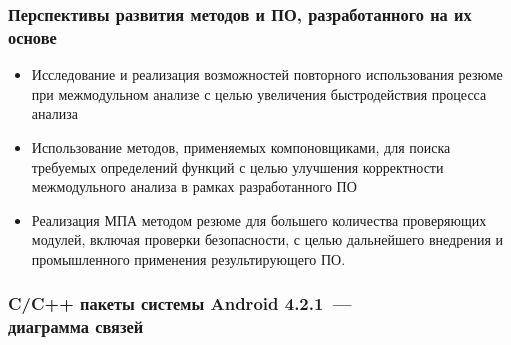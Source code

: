 \documentclass[10pt,gray]{beamer}
\begin{document}
\begin{frame}
\frametitle{Перспективы развития методов и ПО, разработанного на их основе}
\begin{itemize}
  \item Исследование и реализация возможностей повторного использования резюме при межмодульном анализе с целью увеличения быстродействия процесса анализа
  \item Использование методов, применяемых компоновщиками, для поиска требуемых определений функций с целью улучшения корректности межмодульного анализа в рамках разработанного ПО
  \item Реализация МПА методом резюме для большего количества проверяющих модулей, включая проверки безопасности, с целью дальнейшего внедрения и промышленного применения результирующего ПО. 
\end{itemize}
\end{frame}

\begin{frame}
\frametitle{C/C++ пакеты системы Android 4.2.1~---\\диаграмма связей}
\begin{figure}[h]
\end{figure}
\end{frame}
\end{document}
